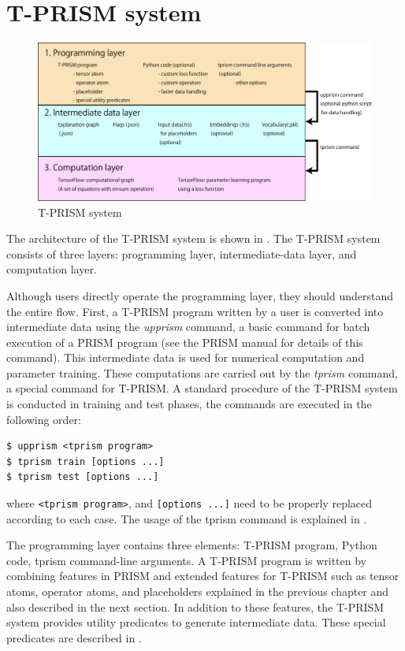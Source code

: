 \documentclass[a4paper]{report}
\begin{document}
\chapter{T-PRISM system}

\begin{figure}[tb]
	\centering
	\includegraphics[width=1.0\linewidth]{tprism_system.pdf}
	\caption[T-PRISM system]{T-PRISM system}
	\label{fig:tprismsystem}
\end{figure}


The architecture of the T-PRISM system is shown in .
The T-PRISM system consists of three layers: programming layer, intermediate-data layer, and computation layer.

Although users directly operate the programming layer, they should understand the entire flow.
First, a T-PRISM program written by a user is converted into intermediate data using the {\it upprism} command, a basic command for batch execution of a PRISM program
(see the PRISM manual for details of this command).
This intermediate data is used for numerical computation and parameter training.
These computations are carried out by the {\it tprism} command, a special command for T-PRISM.
A standard procedure of the T-PRISM system is conducted in training and test phases, the commands are executed in the following order:

\begin{verbatim}
$ upprism <tprism program>
$ tprism train [options ...]
$ tprism test [options ...]
\end{verbatim}

where \verb|<tprism program>|, and \verb|[options ...]| need to be properly replaced according to each case.
The usage of the tprism command is explained in .



The programming layer contains three elements: T-PRISM program, Python code, tprism command-line arguments.
A T-PRISM program is written by combining features in PRISM and extended features for  T-PRISM such as tensor atoms, operator atoms, and placeholders explained in the previous chapter and also described in the next section.
In addition to these features, the T-PRISM system provides utility predicates to generate intermediate data.
These special predicates are described in .
\end{document}
